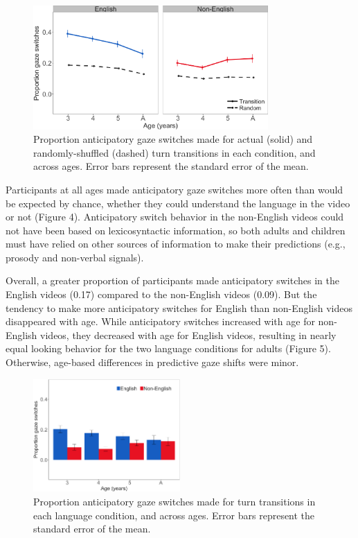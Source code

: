\documentclass[authoryear, 12pt]{elsarticle}
\begin{document}
\begin{figure}[ht]
\begin{center}
\includegraphics[width=0.8\textwidth]{figures/FIG-randvsreal-FL.png}
\end{center}
\caption{Proportion anticipatory gaze switches made for actual (solid) and randomly-shuffled (dashed) turn transitions in each condition, and across ages. Error bars represent the standard error of the mean.} 
\label{randvsrealFL}
\end{figure}

Participants at all ages made anticipatory gaze switches more often than would be expected by chance, whether they could understand the language in the video or not (Figure 4). Anticipatory switch behavior in the non-English videos could not have been based on lexicosyntactic information, so both adults and children must have relied on other sources of information to make their predictions (e.g., prosody and non-verbal signals).

Overall, a greater proportion of participants made anticipatory switches in the English videos (0.17) compared to the non-English videos (0.09). But the tendency to make more anticipatory switches for English than non-English videos disappeared with age. While anticipatory switches increased with age for non-English videos, they decreased with age for English videos, resulting in nearly equal looking behavior for the two language conditions for adults  (Figure 5). Otherwise, age-based differences in predictive gaze shifts were minor.

\begin{figure}[ht]
\begin{center}
\includegraphics[width=0.5\textwidth]{figures/FIG-conditions-FL.png}
\end{center}
\caption{Proportion anticipatory gaze switches made for turn transitions in each language condition, and across ages. Error bars represent the standard error of the mean.} 
\label{conditionsFL}
\end{figure}
\end{document}
